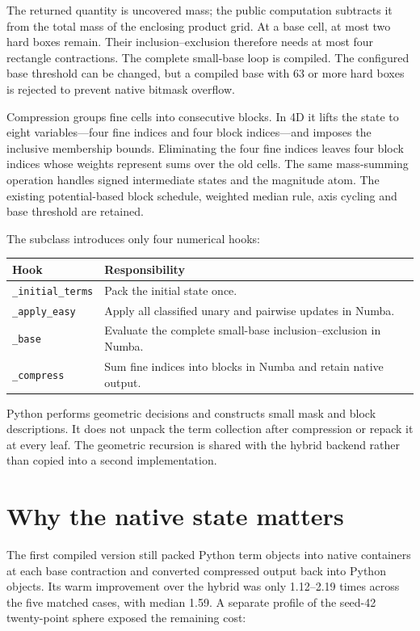 \documentclass[12pt,a4paper]{article}
\begin{document}
The returned quantity is uncovered mass; the public computation subtracts it
from the total mass of the enclosing product grid. At a base cell, at most
two hard boxes remain. Their inclusion--exclusion therefore needs at most
four rectangle contractions. The complete small-base loop is compiled.
The configured base threshold can be changed, but a compiled base with 63
or more hard boxes is rejected to prevent native bitmask overflow.

Compression groups fine cells into consecutive blocks. In 4D it lifts the
state to eight variables---four fine indices and four block indices---and
imposes the inclusive membership bounds. Eliminating the four fine indices
leaves four block indices whose weights represent sums over the old cells.
The same mass-summing operation handles signed intermediate states and the
magnitude atom. The existing potential-based block schedule, weighted median
rule, axis cycling and base threshold are retained.

The subclass introduces only four numerical hooks:
\begin{center}\small
\begin{tabular}{lp{98mm}}\toprule
Hook & Responsibility\\\midrule
\texttt{\_initial\_terms} & Pack the initial state once.\\
\texttt{\_apply\_easy} & Apply all classified unary and pairwise updates in Numba.\\
\texttt{\_base} & Evaluate the complete small-base inclusion--exclusion in Numba.\\
\texttt{\_compress} & Sum fine indices into blocks in Numba and retain native output.\\
\bottomrule\end{tabular}
\end{center}
Python performs geometric decisions and constructs small mask and block
descriptions. It does not unpack the term collection after compression or
repack it at every leaf. The geometric recursion is shared with the hybrid
backend rather than copied into a second implementation.

\section{Why the native state matters}
The first compiled version still packed Python term objects into native
containers at each base contraction and converted compressed output back
into Python objects. Its warm improvement over the hybrid was only
1.12--2.19 times across the five matched cases, with median 1.59.
A separate profile of the seed-42 twenty-point sphere exposed the remaining cost:
\end{document}
